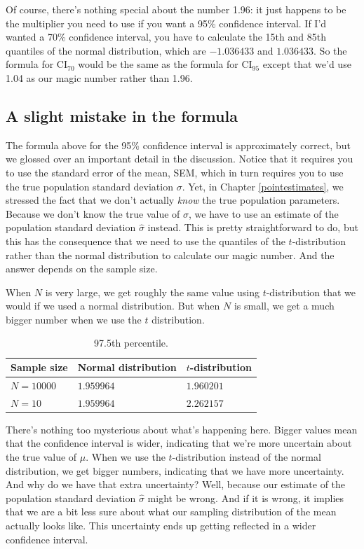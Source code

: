 \documentclass[
]{book}
\theoremstyle{definition}
\theoremstyle{definition}
\theoremstyle{definition}
\theoremstyle{definition}
\theoremstyle{remark}
\begin{document}
Of course, there's nothing special about the number 1.96: it just happens to be the multiplier you need to use if you want a 95\% confidence interval. If I'd wanted a 70\% confidence interval, you have to calculate the 15th and 85th quantiles of the normal distribution, which are \(-1.036433\) and \(1.036433\). So the formula for \(\mbox{CI}_{70}\) would be the same as the formula for \(\mbox{CI}_{95}\) except that we'd use 1.04 as our magic number rather than 1.96.

\hypertarget{a-slight-mistake-in-the-formula}{%
\subsection{A slight mistake in the formula}\label{a-slight-mistake-in-the-formula}}

The formula above for the 95\% confidence interval is approximately correct, but we glossed over an important detail in the discussion. Notice that it requires you to use the standard error of the mean, SEM, which in turn requires you to use the true population standard deviation \(\sigma\). Yet, in Chapter \ref{pointestimates}, we stressed the fact that we don't actually \emph{know} the true population parameters. Because we don't know the true value of \(\sigma\), we have to use an estimate of the population standard deviation \(\hat{\sigma}\) instead. This is pretty straightforward to do, but this has the consequence that we need to use the quantiles of the \(t\)-distribution rather than the normal distribution to calculate our magic number. And the answer depends on the sample size.

When \(N\) is very large, we get roughly the same value using \(t\)-distribution that we would if we used a normal distribution. But when \(N\) is small, we get a much bigger number when we use the \(t\) distribution.

\begin{table}

\caption{\label{tab:unnamed-chunk-26}97.5th percentile.}
\centering
\begin{tabular}[t]{lll}
\toprule
Sample size & Normal distribution & $t$-distribution\\
\midrule
$N=10000$ & $1.959964$ & $1.960201$\\
$N=10$ & $1.959964$ & $2.262157$\\
\bottomrule
\end{tabular}
\end{table}

There's nothing too mysterious about what's happening here. Bigger values mean that the confidence interval is wider, indicating that we're more uncertain about the true value of \(\mu\). When we use the \(t\)-distribution instead of the normal distribution, we get bigger numbers, indicating that we have more uncertainty. And why do we have that extra uncertainty? Well, because our estimate of the population standard deviation \(\hat\sigma\) might be wrong. And if it is wrong, it implies that we are a bit less sure about what our sampling distribution of the mean actually looks like. This uncertainty ends up getting reflected in a wider confidence interval.
\end{document}
